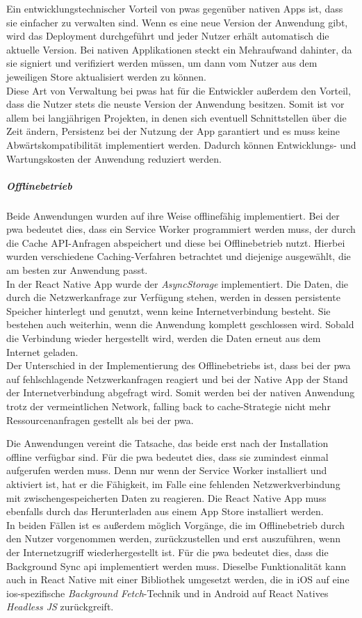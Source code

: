 Ein entwicklungstechnischer Vorteil von \acp{pwa} gegenüber nativen Apps ist, dass sie einfacher zu verwalten sind.
Wenn es eine neue Version der Anwendung gibt, wird das Deployment durchgeführt und jeder Nutzer erhält automatisch die aktuelle Version.
Bei nativen Applikationen steckt ein Mehraufwand dahinter, da sie signiert und verifiziert werden müssen, um dann vom Nutzer aus dem jeweiligen Store aktualisiert werden zu können.\\
Diese Art von Verwaltung bei \acp{pwa} hat für die Entwickler außerdem den Vorteil, dass die Nutzer stets die neuste Version der Anwendung besitzen.
Somit ist vor allem bei langjährigen Projekten, in denen sich eventuell Schnittstellen über die Zeit ändern, Persistenz bei der Nutzung der App garantiert und es muss keine Abwärtskompatibilität implementiert werden.
Dadurch können Entwicklungs- und Wartungskosten der Anwendung reduziert werden.

\subparagraph{Offlinebetrieb\\}
Beide Anwendungen wurden auf ihre Weise offlinefähig implementiert.
Bei der \ac{pwa} bedeutet dies, dass ein Service Worker programmiert werden muss, der durch die Cache API-Anfragen abspeichert und diese bei Offlinebetrieb nutzt.
Hierbei wurden verschiedene Caching-Verfahren betrachtet und diejenige ausgewählt, die am besten zur Anwendung passt.\\
In der React Native App wurde der \textit{AsyncStorage} implementiert.
Die Daten, die durch die Netzwerkanfrage zur Verfügung stehen, werden in dessen persistente Speicher hinterlegt und genutzt, wenn keine Internetverbindung besteht.
Sie bestehen auch weiterhin, wenn die Anwendung komplett geschlossen wird.
Sobald die Verbindung wieder hergestellt wird, werden die Daten erneut aus dem Internet geladen.\\
Der Unterschied in der Implementierung des Offlinebetriebs ist, dass bei der \ac{pwa} auf fehlschlagende Netzwerkanfragen reagiert und bei der Native App der Stand der Internetverbindung abgefragt wird.
Somit werden bei der nativen Anwendung trotz der vermeintlichen \glqq Network, falling back to cache\grqq{}-Strategie nicht mehr Ressourcenanfragen gestellt als bei der \ac{pwa}.

Die Anwendungen vereint die Tatsache, das beide erst nach der Installation offline verfügbar sind.
Für die \ac{pwa} bedeutet dies, dass sie zumindest einmal aufgerufen werden muss.
Denn nur wenn der Service Worker installiert und aktiviert ist, hat er die Fähigkeit, im Falle eine fehlenden Netzwerkverbindung mit zwischengespeicherten Daten zu reagieren.
Die React Native App muss ebenfalls durch das Herunterladen aus einem App Store installiert werden.\\
In beiden Fällen ist es außerdem möglich Vorgänge, die im Offlinebetrieb durch den Nutzer vorgenommen werden, zurückzustellen und erst auszuführen, wenn der Internetzugriff wiederhergestellt ist.
Für die \ac{pwa} bedeutet dies, dass die Background Sync \ac{api} implementiert werden muss.
Dieselbe Funktionalität kann auch in React Native mit einer Bibliothek umgesetzt werden, die in iOS auf eine ios-spezifische \textit{Background Fetch}-Technik und in Android auf React Natives \textit{Headless JS} zurückgreift.

